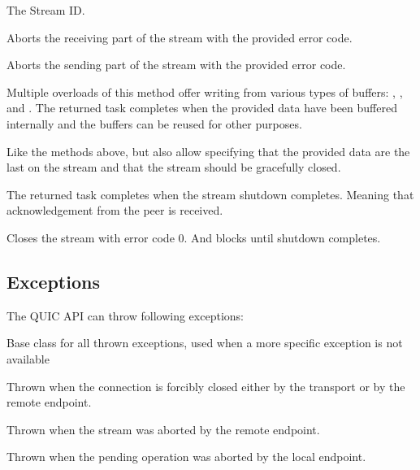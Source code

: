 \begin{description}

     The Stream ID\@.

     Aborts the receiving part of the stream with the provided error code.

     Aborts the sending part of the stream with the provided error code.

     Multiple overloads of this method offer writing from various types of buffers: , , and . The returned task completes when the provided data have been buffered internally and the buffers can be reused for other purposes.

     Like the methods above, but also allow specifying that the provided data are the last on the stream and that the stream should be gracefully closed.

     The returned task completes when the stream shutdown completes. Meaning that acknowledgement from the peer is received.

     Closes the stream with error code 0. And blocks until shutdown completes.

\end{description}

\subsection{Exceptions}

The QUIC API can throw following exceptions:

\begin{description}

     Base class for all thrown exceptions, used when a more specific exception is not available

     Thrown when the connection is forcibly closed either by the transport or by the remote endpoint.

     Thrown when the stream was aborted by the remote endpoint.

     Thrown when the pending operation was aborted by the local endpoint.

\end{description}

